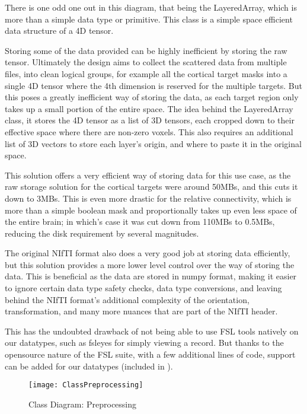 There is one odd one out in this diagram, that being the LayeredArray, which is more than a simple data type or primitive. This class is a simple space efficient data structure of a 4D tensor.\par
Storing some of the data provided can be highly inefficient by storing the raw tensor. Ultimately the design aims to collect the scattered data from multiple files, into clean logical groups, for example all the cortical target masks into a single 4D tensor where the 4th dimension is reserved for the multiple targets. But this poses a greatly inefficient way of storing the data, as each target region only takes up a small portion of the entire space. The idea behind the LayeredArray class, it stores the 4D tensor as a list of 3D tensors, each cropped down to their effective space where there are non-zero voxels. This also requires an additional list of 3D vectors to store each layer's origin, and where to paste it in the original space.\par
This solution offers a very efficient way of storing data for this use case, as the raw storage solution for the cortical targets were around 50MBs, and this cuts it down to 3MBs. This is even more drastic for the relative connectivity, which is more than a simple boolean mask and proportionally takes up even less space of the entire brain; in which's case it was cut down from 110MBs to 0.5MBs, reducing the disk requirement by several magnitudes.\par
The original \ac{NIfTI} format also does a very good job at storing data efficiently, but this solution provides a more lower level control over the way of storing the data. This is beneficial as the data are stored in numpy format, making it easier to ignore certain data type safety checks, data type conversions, and leaving behind the \ac{NIfTI} format's additional complexity of the orientation, transformation, and many more nuances that are part of the \ac{NIfTI} header.\par
This has the undoubted drawback of not being able to use \ac{FSL} tools natively on our datatypes, such as fsleyes for simply viewing a record. But thanks to the opensource nature of the \ac{FSL} suite, with a few additional lines of code, support can be added for our datatypes (included in ).

\begin{figure}[H]
\centering
\texttt{[image: ClassPreprocessing]}
\caption{Class Diagram: Preprocessing}
\end{figure}

